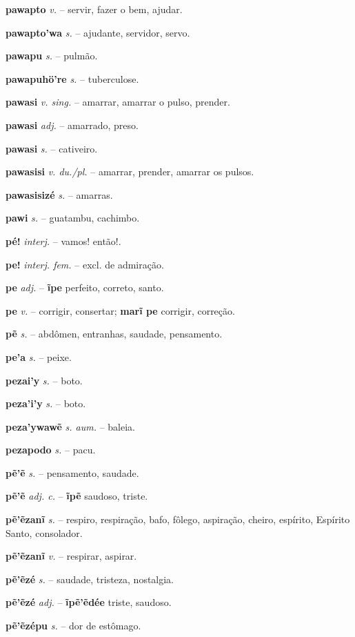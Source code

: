\textbf{pawapto} \textit{v.} -- servir, fazer o bem, ajudar.

\textbf{pawapto'wa} \textit{s.} -- ajudante, servidor, servo.

\textbf{pawapu} \textit{s.} -- pulmão.

\textbf{pawapuhö're} \textit{s.} -- tuberculose.

\textbf{pawasi} \textit{v. sing.} -- amarrar, amarrar o pulso, prender.

\textbf{pawasi} \textit{adj.} -- amarrado, preso.

\textbf{pawasi} \textit{s.} -- cativeiro.

\textbf{pawasisi} \textit{v. du./pl.} -- amarrar, prender, amarrar os pulsos.

\textbf{pawasisizé} \textit{s.} -- amarras.

\textbf{pawi} \textit{s.} -- guatambu, cachimbo.

\textbf{pé!} \textit{interj.} -- vamos! então!.

\textbf{pe!} \textit{interj. fem.} -- excl. de admiração.

\textbf{pe} \textit{adj.} -- \textbf{ĩpe} perfeito, correto, santo.

\textbf{pe} \textit{v.} -- corrigir, consertar; \textbf{marĩ pe} corrigir, correção.

\textbf{pẽ} \textit{s.} -- abdômen, entranhas, saudade, pensamento.

\textbf{pe'a} \textit{s.} -- peixe.

\textbf{pezai'y} \textit{s.} -- boto.

\textbf{peza'i'y} \textit{s.} -- boto.

\textbf{peza'ywawẽ} \textit{s. aum.} -- baleia.

\textbf{pezapodo} \textit{s.} -- pacu.

\textbf{pẽ'ẽ} \textit{s.} -- pensamento, saudade.

\textbf{pẽ'ẽ} \textit{adj. c.} -- \textbf{ĩpẽ} saudoso, triste.

\textbf{pẽ'ẽzanĩ} \textit{s.} -- respiro, respiração, bafo, fôlego, aspiração, cheiro, espírito, Espírito Santo, consolador.

\textbf{pẽ'ẽzanĩ} \textit{v.} -- respirar, aspirar.

\textbf{pẽ'ẽzé} \textit{s.} -- saudade, tristeza, nostalgia.

\textbf{pẽ'ẽzé} \textit{adj.} -- \textbf{ĩpẽ'ẽdée} triste, saudoso.

\textbf{pẽ'ẽzépu} \textit{s.} -- dor de estômago.

